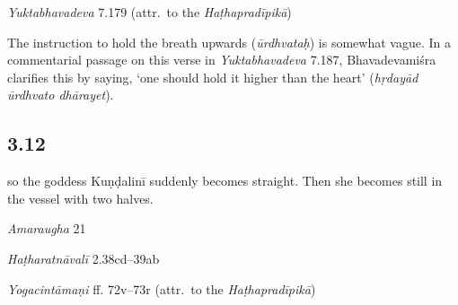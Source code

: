 \begin{ekdosis}
\begin{testimonia}[hp03_011]
\emph{Yuktabhavadeva} 7.179 (attr.~to the \emph{Haṭhapradīpikā})
\begin{versinnote}
\end{versinnote}
\end{testimonia}

\begin{philcomm}[hp03_011]
The instruction to hold the breath upwards (\emph{ūrdhvataḥ}) is somewhat vague. In a commentarial passage on this verse in \emph{Yuktabhavadeva} 7.187, Bhavadevamiśra clarifies this by saying, `one should hold it higher than the heart' (\emph{hṛdayād ūrdhvato dhārayet}).
\end{philcomm}

\subsection*{3.12}
\begin{translation}[hp03_012]
[\dots] so the goddess Kuṇḍalinī suddenly becomes straight. Then she becomes still in the vessel with two halves.
\end{translation}

\begin{sources}[hp03_012]
\emph{Amaraugha} 21
\begin{versinnote}
\end{versinnote}
\end{sources}

\begin{testimonia}[hp03_012]
\emph{Haṭharatnāvalī} 2.38cd–39ab
\begin{versinnote}
\end{versinnote}

\emph{Yogacintāmaṇi} ff. 72v–73r (attr.~to the \emph{Haṭhapradīpikā}) %
\begin{versinnote}
\tl{\var{dvipuṭā ] em., dvipaṭā° L, dvipadā° N.} \\!}
\end{versinnote}


\end{testimonia}
\end{ekdosis}

